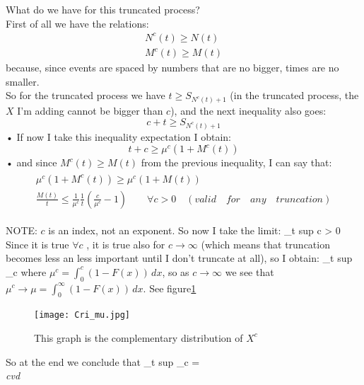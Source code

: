 	What do we have for this truncated process?\\
	First of all we have the relations:
	\begin{equation}
	\begin{split}
	N^c(t) \geq N(t)\\
	M^c(t) \geq M(t)
	\end{split}
	\end{equation}
	because, since events are spaced by numbers that are no bigger, times are no smaller.\\

	So for the truncated process we have $t \geq S_{N^c(t) +1}$ (in the truncated process, the $X$ I'm adding cannot be bigger than $c$), and the next inequality also goes:
	\begin{equation}
	c+t \geq S_{N^c(t)+1}
	\end{equation}•
	If now I take this inequality expectation I obtain:
	\begin{equation}
	t+c \geq \mu^c(1+M^c(t))
	\end{equation}•
	and since $M^c(t) \geq M(t)$ from the previous inequality, I can say that:
	\begin{align}
	\begin{split}
	\mu^c(1+M^c(t)) \geq \mu^c(1+M(t))\\
	\frac{M(t)}{t} \leq \frac{1}{\mu^c} \frac{1}{t}(\frac{c}{\mu^c}-1) \qquad \forall c > 0 \quad (valid\quad for\quad any\quad truncation)
	\end{split}
	\end{align}

	NOTE: $c$ is an index, not an exponent.
	So now I take the limit:
	\beq
	\lim_{t \to \infty} sup  \leq {} \qquad \forall c > 0
	\eeq
	Since it is true $\forall c$ , it is true also for $c \to \infty$ (which means that truncation becomes less an less important until I don't truncate at all), so I obtain:
	\beq
	\lim_{t \to \infty} sup  \leq \lim_{c \to \infty} 
	\eeq
	where $\mu^c = \int_0^c(1-F(x))\,dx$, so as $c \to \infty$ we see that $\mu^c \to \mu = \int_0^\infty(1-F(x))\,dx$. See figure\ref{fig:mu}
	\begin{figure}
	\centering
	\texttt{[image: Cri\_mu.jpg]}
	\caption{This graph is the complementary distribution of $X^c$}
	\label{fig:mu}
	\end{figure}
	So at the end we conclude that
	\beq
	\lim_{t \to \infty} sup  \leq \lim_{c \to \infty}  = 
	\eeq
	\\
	\textit{cvd}
